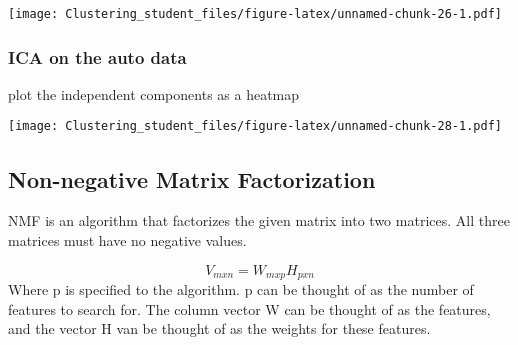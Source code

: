 \documentclass[11pt,]{article}
\newenvironment{Shaded}{\begin{snugshade}}{\end{snugshade}}
\newcommand{\DataTypeTok}[1]{\textcolor[rgb]{0.13,0.29,0.53}{#1}}
\newcommand{\DecValTok}[1]{\textcolor[rgb]{0.00,0.00,0.81}{#1}}
\newcommand{\KeywordTok}[1]{\textcolor[rgb]{0.13,0.29,0.53}{\textbf{#1}}}
\newcommand{\NormalTok}[1]{#1}
\newcommand{\OperatorTok}[1]{\textcolor[rgb]{0.81,0.36,0.00}{\textbf{#1}}}
\newcommand{\StringTok}[1]{\textcolor[rgb]{0.31,0.60,0.02}{#1}}
\begin{document}
\begin{Shaded}
\end{Shaded}

\texttt{[image: Clustering\_student\_files/figure-latex/unnamed-chunk-26-1.pdf]}

\hypertarget{ica-on-the-auto-data}{%
\subsubsection{ICA on the auto data}\label{ica-on-the-auto-data}}

plot the independent components as a heatmap

\begin{Shaded}
\end{Shaded}

\texttt{[image: Clustering\_student\_files/figure-latex/unnamed-chunk-28-1.pdf]}

\newpage

\hypertarget{non-negative-matrix-factorization}{%
\subsection{Non-negative Matrix
Factorization}\label{non-negative-matrix-factorization}}

NMF is an algorithm that factorizes the given matrix into two matrices.
All three matrices must have no negative values.

\[V_{mxn}=W_{mxp}H_{pxn}\] Where p is specified to the algorithm. p can
be thought of as the number of features to search for. The column vector
W can be thought of as the features, and the vector H van be thought of
as the weights for these features.
\end{document}
